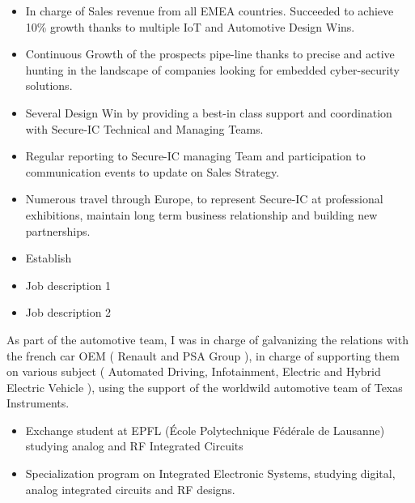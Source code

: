 \documentclass[10pt,a4paper,ragged2e]{altacv}
\begin{document}
\begin{paracol}{2}

\begin{itemize}
\item In charge of Sales revenue from all EMEA countries. Succeeded to achieve 10\% growth thanks to multiple IoT and Automotive Design Wins.
\item Continuous Growth of the prospects pipe-line thanks to precise and active hunting in the landscape of companies looking for embedded cyber-security solutions.
\item Several Design Win  by providing a best-in class support and coordination with Secure-IC Technical and Managing Teams.
\item Regular reporting to Secure-IC managing Team and participation to communication events to update on Sales Strategy.
\item Numerous travel through Europe, to represent Secure-IC at professional exhibitions, maintain long term business relationship and building new partnerships.
\item Establish 
\end{itemize}

\divider

\begin{itemize}
\item Job description 1
\item Job description 2
\end{itemize}

\divider

As part of the automotive team, I was in charge of galvanizing the relations with the french car OEM ( Renault and PSA Group ), in charge of supporting them on various subject ( Automated Driving, Infotainment, Electric and Hybrid Electric Vehicle ), using the support of the worldwild automotive team of Texas Instruments.


\begin{itemize}
\item Exchange student at EPFL (École Polytechnique Fédérale de Lausanne) studying analog and RF Integrated Circuits
\item Specialization program on Integrated Electronic Systems, studying digital, analog integrated circuits and RF designs. \newline{}
\end{itemize}



\end{paracol}
\end{document}

